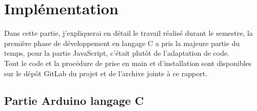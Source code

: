 \newpage
\section{Implémentation}
Dans cette partie, j'expliquerai en détail le travail réalisé durant le semestre, la première phase de développement en langage C a pris la majeure partie du temps, pour la partie JavaScript,  c'était plutôt de l'adaptation de code.\\

Tout le code et la procédure de prise en main et d'installation sont disponibles sur le dépôt GitLab du projet et de l'archive jointe à ce rapport.\\


\subsection{Partie Arduino langage C}
